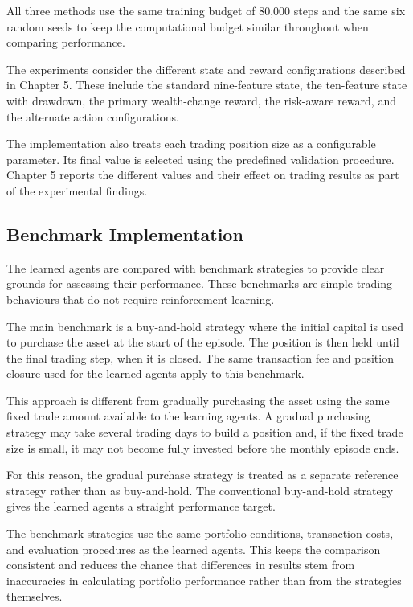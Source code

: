 All three methods use the same training budget of 80,000 steps and the
same six random seeds to keep the computational budget similar
throughout when comparing performance.

The experiments consider the different state and reward configurations
described in Chapter 5. These include the standard nine-feature state,
the ten-feature state with drawdown, the primary wealth-change reward,
the risk-aware reward, and the alternate action configurations.

The implementation also treats each trading position size as a
configurable parameter. Its final value is selected using the predefined
validation procedure. Chapter 5 reports the different values and their
effect on trading results as part of the experimental findings.

\subsection{Benchmark Implementation}

The learned agents are compared with benchmark strategies to provide
clear grounds for assessing their performance. These benchmarks are
simple trading behaviours that do not require reinforcement learning.

The main benchmark is a buy-and-hold strategy where the initial capital
is used to purchase the asset at the start of the episode. The position
is then held until the final trading step, when it is closed. The same
transaction fee and position closure used for the learned agents apply
to this benchmark.

This approach is different from gradually purchasing the asset using the
same fixed trade amount available to the learning agents. A gradual
purchasing strategy may take several trading days to build a position
and, if the fixed trade size is small, it may not become fully invested
before the monthly episode ends.

For this reason, the gradual purchase strategy is treated as a separate
reference strategy rather than as buy-and-hold. The conventional
buy-and-hold strategy gives the learned agents a straight performance
target.

The benchmark strategies use the same portfolio conditions, transaction
costs, and evaluation procedures as the learned agents. This keeps the
comparison consistent and reduces the chance that differences in results
stem from inaccuracies in calculating portfolio performance rather than
from the strategies themselves.

